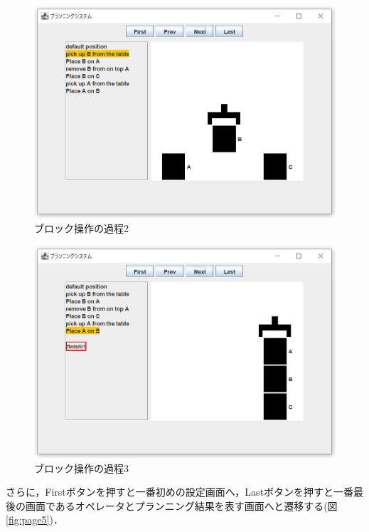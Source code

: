 \documentclass[uplatex,12pt]{jsarticle}
\begin{document}
\begin{figure}[htbp]
  \begin{center}
    \includegraphics[scale=0.6]{images/page3.PNG}
    \caption{ブロック操作の過程2}
    \label{fig:page3}
  \end{center}
\end{figure}
\begin{figure}[htbp]
  \begin{center}
    \includegraphics[scale=0.6]{images/page4.PNG}
    \caption{ブロック操作の過程3}
    \label{fig:page4}
  \end{center}
\end{figure}
\clearpage
さらに，Firstボタンを押すと一番初めの設定画面へ，Lastボタンを押すと一番最後の画面であるオペレータとプランニング結果を表す画面へと遷移する(図\ref{fig:page5})．\\
\end{document}
